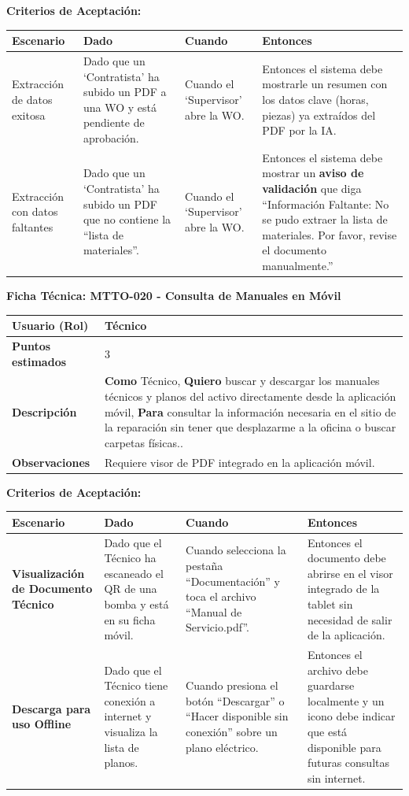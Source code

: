 \noindent
\textbf{Criterios de Aceptación:}
\footnotesize
\begin{longtable}{|p{}|p{}|p{}|p{}|}
\hline
\textbf{Escenario} & \textbf{Dado} & \textbf{Cuando} & \textbf{Entonces} \\ \hline
\endhead
Extracción de datos exitosa & Dado que un `Contratista' ha subido un PDF a una WO y está pendiente de aprobación. & Cuando el `Supervisor' abre la WO. & Entonces el sistema debe mostrarle un resumen con los datos clave (horas, piezas) ya extraídos del PDF por la IA. \\ \hline
Extracción con datos faltantes & Dado que un `Contratista' ha subido un PDF que no contiene la ``lista de materiales''. & Cuando el `Supervisor' abre la WO. & Entonces el sistema debe mostrar un \textbf{aviso de validación} que diga ``Información Faltante: No se pudo extraer la lista de materiales. Por favor, revise el documento manualmente.'' \\ \hline
\end{longtable}
\normalsize

\noindent
\textbf{Ficha Técnica: MTTO-020 - Consulta de Manuales en Móvil}
\footnotesize
\begin{longtable}{|p{}|p{}|}
\hline
\textbf{Usuario (Rol)} & Técnico \\ \hline
\textbf{Puntos estimados} & 3 \\ \hline
\textbf{Descripción} & \textbf{Como} Técnico, \textbf{Quiero} buscar y descargar los manuales técnicos y planos del activo directamente desde la aplicación móvil, \textbf{Para} consultar la información necesaria en el sitio de la reparación sin tener que desplazarme a la oficina o buscar carpetas físicas.. \\ \hline
\textbf{Observaciones} & Requiere visor de PDF integrado en la aplicación móvil. \\ \hline
\end{longtable}
\normalsize

\noindent
\textbf{Criterios de Aceptación:}
\footnotesize
\begin{longtable}{|p{}|p{}|p{}|p{}|}
\hline
\textbf{Escenario} & \textbf{Dado} & \textbf{Cuando} & \textbf{Entonces} \\ \hline
\endhead
\textbf{Visualización de Documento Técnico} & Dado que el Técnico ha escaneado el QR de una bomba y está en su ficha móvil. & Cuando selecciona la pestaña ``Documentación'' y toca el archivo ``Manual de Servicio.pdf''. & Entonces el documento debe abrirse en el visor integrado de la tablet sin necesidad de salir de la aplicación. \\ \hline
\textbf{Descarga para uso Offline} & Dado que el Técnico tiene conexión a internet y visualiza la lista de planos. & Cuando presiona el botón ``Descargar'' o ``Hacer disponible sin conexión'' sobre un plano eléctrico. & Entonces el archivo debe guardarse localmente y un icono debe indicar que está disponible para futuras consultas sin internet. \\ \hline
\end{longtable}
\normalsize

